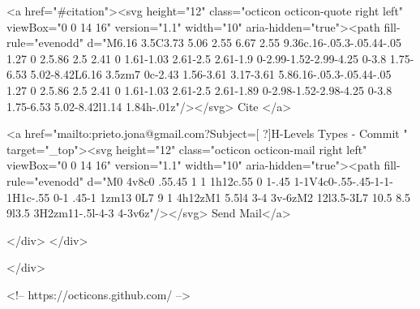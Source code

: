       <a  href="#citation"><svg height="12" class="octicon octicon-quote right left" viewBox="0 0 14 16" version="1.1" width="10" aria-hidden="true"><path fill-rule="evenodd" d="M6.16 3.5C3.73 5.06 2.55 6.67 2.55 9.36c.16-.05.3-.05.44-.05 1.27 0 2.5.86 2.5 2.41 0 1.61-1.03 2.61-2.5 2.61-1.9 0-2.99-1.52-2.99-4.25 0-3.8 1.75-6.53 5.02-8.42L6.16 3.5zm7 0c-2.43 1.56-3.61 3.17-3.61 5.86.16-.05.3-.05.44-.05 1.27 0 2.5.86 2.5 2.41 0 1.61-1.03 2.61-2.5 2.61-1.89 0-2.98-1.52-2.98-4.25 0-3.8 1.75-6.53 5.02-8.42l1.14 1.84h-.01z"/></svg> Cite
      </a>

      <a href="mailto:prieto.jona@gmail.com?Subject=[ ?]H-Levels Types - Commit " target="_top"><svg height="12" class="octicon octicon-mail right left" viewBox="0 0 14 16" version="1.1" width="10" aria-hidden="true"><path fill-rule="evenodd" d="M0 4v8c0 .55.45 1 1 1h12c.55 0 1-.45 1-1V4c0-.55-.45-1-1-1H1c-.55 0-1 .45-1 1zm13 0L7 9 1 4h12zM1 5.5l4 3-4 3v-6zM2 12l3.5-3L7 10.5 8.5 9l3.5 3H2zm11-.5l-4-3 4-3v6z"/></svg> Send Mail</a>

    </div>
  </div>

</div>

<!-- https://octicons.github.com/ -->





